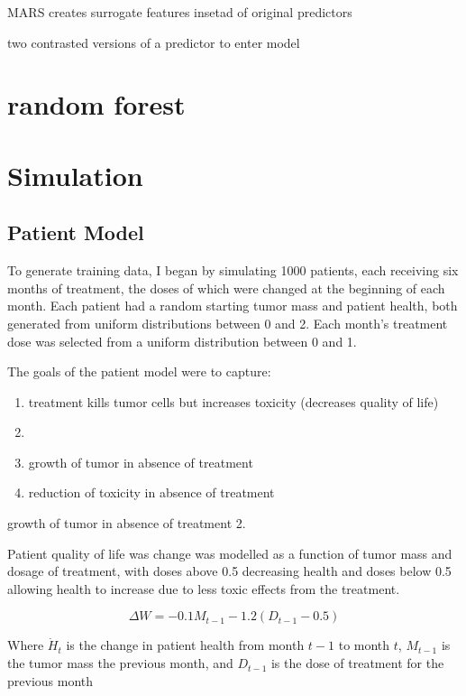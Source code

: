 \documentclass[12pt]{article}
\begin{document}
MARS creates surrogate features insetad of original predictors

two contrasted versions of a predictor to enter model


\section{random forest} %
\label{sec:random_forest}


\section{Simulation}

\subsection{Patient Model} %
\label{sub:vpm}

To generate training data, I began by simulating 1000 patients, each receiving six months of treatment, the doses of which were changed at the beginning of each month. Each patient had a random starting tumor mass and patient health, both generated from uniform distributions between 0 and 2. Each month's treatment dose was selected from a uniform distribution between 0 and 1.

The goals of the patient model were to capture:

\begin{enumerate}
  \item treatment kills tumor cells but increases toxicity (decreases quality of life)
  \item 
  \item growth of tumor in absence of treatment
  \item reduction of toxicity in absence of treatment
\end{enumerate}growth of tumor in absence of treatment 2. 

Patient quality of life was  change was modelled as a function of tumor mass and dosage of treatment, with doses above 0.5 decreasing health and doses below 0.5 allowing health to increase due to less toxic effects from the treatment.

\[
\Delta W = - 0.1 M_{t-1} - 1.2 (D_{t-1} - 0.5)
\]

Where $\dot{H}_{t}$ is the change in patient health from month $t-1$ to month $t$, 
$M_{t-1}$ is the tumor mass the previous month, and 
$D_{t-1}$ is the dose of treatment for the previous month
\end{document}
